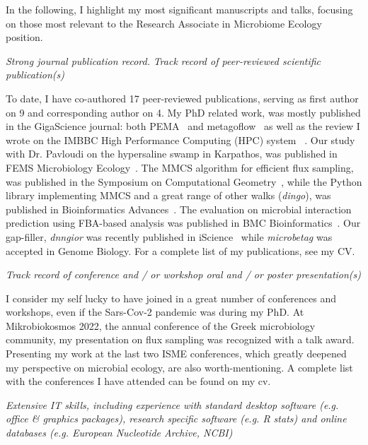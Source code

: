     In the following, I highlight my most significant manuscripts and talks, 
    focusing on those most relevant to the Research Associate in Microbiome Ecology position.

\textit{Strong journal publication record.}
\textit{Track record of peer-reviewed scientific publication(s)}


    To date, I have co-authored 17 peer-reviewed publications, 
    serving as first author on 9 and corresponding author on 4.
    My PhD related work, was mostly published in the GigaScience journal:
    both PEMA~\cite{zafeiropoulos2020pema} and metagoflow~\cite{zafeiropoulos2023metagoflow}
    as well as the review I wrote on the IMBBC High Performance Computing (HPC) system 
    ~\cite{zafeiropoulos20210s}.
    Our study with Dr. Pavloudi on the hypersaline swamp in Karpathos, 
    was published in FEMS Microbiology Ecology~\cite{pavloudi2022deciphering}.    
    The MMCS algorithm for efficient flux sampling, was published in the
    Symposium on Computational Geometry~\cite{socg2021}, while
    the Python library implementing MMCS and a great range of other walks (\textit{dingo}),
    was published in Bioinformatics Advances~\cite{chalkis2024dingo}.
    The evaluation on microbial interaction prediction using FBA-based analysis 
    was published in BMC Bioinformatics~\cite{joseph2024predicting}.
    Our gap-filler, \textit{dnngior} was recently published in iScience~\cite{boer2024improving}
    while \textit{microbetag} was accepted in Genome Biology. 
    For a complete list of my publications, see my CV.


\textit{Track record of conference and / or workshop oral and / or poster presentation(s)}

    I consider my self lucky to have joined in a great number of conferences and workshops,
    even if the Sars-Cov-2 pandemic was during my PhD. 
    At Mikrobiokosmos 2022, the annual conference of the Greek microbiology community, 
    my presentation on flux sampling was recognized with a talk award.
    Presenting my work at the last two ISME conferences, 
    which greatly deepened my perspective on microbial ecology, 
    are also worth-mentioning.
    A complete list with the conferences I have attended can be found on my cv.


\textit{
    Extensive IT skills, including experience with standard desktop software 
    (e.g. office \& graphics packages), research specific software (e.g. R stats) 
    and online databases (e.g. European Nucleotide Archive, NCBI)
}


